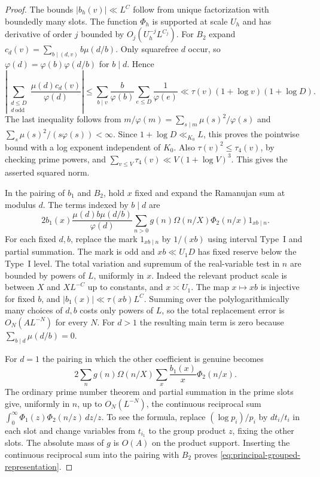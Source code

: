 \documentclass[11pt,a4paper]{article}
\theoremstyle{paperplain}
\numberwithin{equation}{section}
\begin{document}
\begin{proof}
The bounds $|b_h(v)|\ll L^C$ follow from unique factorization
with boundedly many slots. The function $\Phi_h$ is supported at
scale $U_h$ and has derivative of order $j$ bounded by
$O_j(U_h^{-j}L^{C_j})$. For $B_2$ expand
$c_d(v)=\sum_{b\mid(d,v)}b\mu(d/b)$. Only squarefree $d$ occur,
so $\varphi(d)=\varphi(b)\varphi(d/b)$ for $b\mid d$. Hence
\[
 \left|\sum_{\substack{d\le D\\ d\ \mathrm{odd}}}
            \frac{\mu(d)c_d(v)}{\varphi(d)}\right|
 \le \sum_{b\mid v}\frac{b}{\varphi(b)}\sum_{e\le D}\frac1{\varphi(e)}
 \ll \tau(v)(1+\log v)(1+\log D).
\]
The last inequality follows from
$m/\varphi(m)=\sum_{s\mid m}\mu(s)^2/\varphi(s)$ and
$\sum_s\mu(s)^2/(s\varphi(s))<\infty$. Since
$1+\log D\ll_{K_0}L$, this proves the pointwise bound with a log
exponent independent of $K_0$. Also $\tau(v)^2\le\tau_4(v)$, by
checking prime powers, and $\sum_{v\le V}\tau_4(v)\ll V(1+\log V)^3$.
This gives the asserted squared norm.

In the pairing of $b_1$ and $B_2$, hold $x$ fixed and expand the
Ramanujan sum at modulus $d$. The terms indexed by $b\mid d$ are
\[
 2b_1(x)\frac{\mu(d)b\mu(d/b)}{\varphi(d)}
     \sum_{n>0} g(n)\Omega(n/X)\Phi_2(n/x)1_{xb\mid n}.
\]
For each fixed $d,b$, replace the mark $1_{xb\mid n}$ by
$1/(xb)$ using interval Type~I and partial summation. The mark
is odd and $xb\ll U_1D$ has fixed reserve below the Type~I level.
The total variation and supremum of the real-variable test in $n$
are bounded by powers of $L$, uniformly in $x$. Indeed the relevant
product scale is between $X$ and $XL^{-C}$ up to constants, and
$x\asymp U_1$. The map $x\mapsto xb$ is injective for fixed $b$,
and $|b_1(x)|\ll\tau(xb)L^C$. Summing over the polylogarithmically
many choices of $d,b$ costs only powers of $L$, so the total
replacement error is $O_N(AL^{-N})$ for every $N$.
For $d>1$ the resulting main term is zero because
$\sum_{b\mid d}\mu(d/b)=0$.

For $d=1$ the pairing in which the other coefficient is genuine
becomes
\[
 2\sum_n g(n)\Omega(n/X)\sum_x \frac{b_1(x)}{x}\Phi_2(n/x).
\]
The ordinary prime number theorem and partial summation in the
prime slots give, uniformly in $n$, up to $O_N(L^{-N})$, the
continuous reciprocal sum
$\int_0^\infty\Phi_1(z)\Phi_2(n/z)\,dz/z$. To see the formula,
replace $(\log p_i)/p_i$ by $dt_i/t_i$ in each slot and change
variables from $t_{i_1}$ to the group product $z$, fixing the
other slots. The absolute mass of $g$ is $O(A)$ on the product
support. Inserting the continuous reciprocal sum into the pairing
with $B_2$ proves \eqref{eq:principal-grouped-representation}.


\end{proof}
\end{document}
